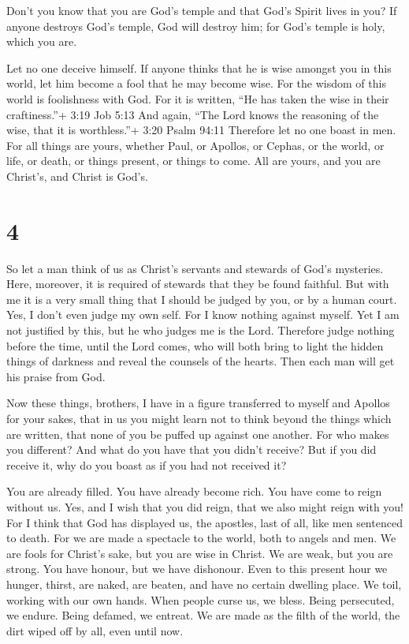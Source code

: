  Don't you know that you are God's temple and that God's
Spirit lives in you?  If anyone destroys God's temple, God
will destroy him; for God's temple is holy, which you are.

 Let no one deceive himself. If anyone thinks that he is
wise amongst you in this world, let him become a fool that he may become
wise.  For the wisdom of this world is foolishness with
God. For it is written, ``He has taken the wise in their craftiness.''+
3:19 Job 5:13  And again, ``The Lord knows the reasoning of
the wise, that it is worthless.''+ 3:20 Psalm 94:11 
Therefore let no one boast in men. For all things are yours,
 whether Paul, or Apollos, or Cephas, or the world, or
life, or death, or things present, or things to come. All are yours,
 and you are Christ's, and Christ is God's.

\hypertarget{section-3}{%
\section{4}\label{section-3}}

 So let a man think of us as Christ's servants and stewards
of God's mysteries.  Here, moreover, it is required of
stewards that they be found faithful.  But with me it is a
very small thing that I should be judged by you, or by a human court.
Yes, I don't even judge my own self.  For I know nothing
against myself. Yet I am not justified by this, but he who judges me is
the Lord.  Therefore judge nothing before the time, until
the Lord comes, who will both bring to light the hidden things of
darkness and reveal the counsels of the hearts. Then each man will get
his praise from God.

 Now these things, brothers, I have in a figure transferred
to myself and Apollos for your sakes, that in us you might learn not to
think beyond the things which are written, that none of you be puffed up
against one another.  For who makes you different? And what
do you have that you didn't receive? But if you did receive it, why do
you boast as if you had not received it?

 You are already filled. You have already become rich. You
have come to reign without us. Yes, and I wish that you did reign, that
we also might reign with you!  For I think that God has
displayed us, the apostles, last of all, like men sentenced to death.
For we are made a spectacle to the world, both to angels and men.
 We are fools for Christ's sake, but you are wise in
Christ. We are weak, but you are strong. You have honour, but we have
dishonour.  Even to this present hour we hunger, thirst,
are naked, are beaten, and have no certain dwelling place. 
We toil, working with our own hands. When people curse us, we bless.
Being persecuted, we endure.  Being defamed, we entreat. We
are made as the filth of the world, the dirt wiped off by all, even
until now.

